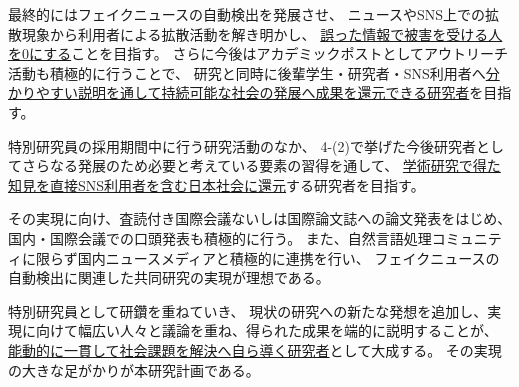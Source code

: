 \begin{spacing}{1.08}
最終的にはフェイクニュースの自動検出を発展させ、
ニュースやSNS上での拡散現象から利用者による拡散活動を解き明かし、
\underline{誤った情報で被害を受ける人を0にする}ことを目指す。
さらに今後はアカデミックポストとしてアウトリーチ活動も積極的に行うことで、
研究と同時に後輩学生・研究者・SNS利用者へ\underline{分かりやすい説明を通して持続可能な社会の発展へ成果を還元できる研究者}を目指す。


\vspace{5mm}
\noindent
{}

特別研究員の採用期間中に行う研究活動のなか、
4-(2)で挙げた今後研究者としてさらなる発展のため必要と考えている要素の習得を通して、
\underline{学術研究で得た知見を直接SNS利用者を含む日本社会に還元}する研究者を目指す。

その実現に向け、査読付き国際会議ないしは国際論文誌への論文発表をはじめ、
国内・国際会議での口頭発表も積極的に行う。
また、自然言語処理コミュニティに限らず国内ニュースメディアと積極的に連携を行い、
フェイクニュースの自動検出に関連した共同研究の実現が理想である。

特別研究員として研鑽を重ねていき、
現状の研究への新たな発想を追加し、実現に向けて幅広い人々と議論を重ね、得られた成果を端的に説明することが、
\underline{能動的に一貫して社会課題を解決へ自ら導く研究者}として大成する。
その実現の大きな足がかりが本研究計画である。
\end{spacing}


